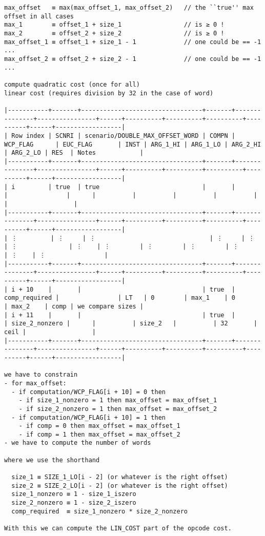 \documentclass[varwidth=\maxdimen,margin=0.5cm,multi={verbatim}]{standalone}
\begin{document}
\begin{verbatim}
max_offset   ≡ max(max_offset_1, max_offset_2)   // the ``true'' max offset in all cases
max_1        ≡ offset_1 + size_1                 // is ≥ 0 !
max_2        ≡ offset_2 + size_2                 // is ≥ 0 !
max_offset_1 ≡ offset_1 + size_1 - 1             // one could be == -1 ...
max_offset_2 ≡ offset_2 + size_2 - 1             // one could be == -1 ...

compute quadratic cost (once for all)
linear cost (requires division by 32 in the case of word)

|-----------+-------+---------------------------------+-------+---------------+----------------+------+----------+----------+----------+----------+------+------------------|
| Row index | SCNRI | scenario/DOUBLE_MAX_OFFSET_WORD | COMPN | WCP_FLAG      | EUC_FLAG       | INST | ARG_1_HI | ARG_1_LO | ARG_2_HI | ARG_2_LO | RES  | Notes            |
|-----------+-------+---------------------------------+-------+---------------+----------------+------+----------+----------+----------+----------+------+------------------|
| i         | true  | true                            |       |               |                |      |          |          |          |          |      |                  |
|-----------+-------+---------------------------------+-------+---------------+----------------+------+----------+----------+----------+----------+------+------------------|
| ⋮         | ⋮     | ⋮                               | ⋮     | ⋮             | ⋮              | ⋮    | ⋮        | ⋮        | ⋮        | ⋮        | ⋮    | ⋮                |
|-----------+-------+---------------------------------+-------+---------------+----------------+------+----------+----------+----------+----------+------+------------------|
| i + 10    |       |                                 | true  | comp_required |                | LT   | 0        | max_1    | 0        | max_2    | comp | we compare sizes |
| i + 11    |       |                                 | true  |               | size_2_nonzero |      |          | size_2   |          | 32       | ceil |                  |
|-----------+-------+---------------------------------+-------+---------------+----------------+------+----------+----------+----------+----------+------+------------------|

we have to constrain
- for max_offset:
  - if computation/WCP_FLAG[i + 10] = 0 then
    - if size_1_nonzero = 1 then max_offset = max_offset_1
    - if size_2_nonzero = 1 then max_offset = max_offset_2
  - if computation/WCP_FLAG[i + 10] = 1 then
    - if comp = 0 then max_offset = max_offset_1
    - if comp = 1 then max_offset = max_offset_2
- we have to compute the number of words

where we use the shorthand

  size_1 ≡ SIZE_1_LO[i - 2] (or whatever is the right offset)
  size_2 ≡ SIZE_2_LO[i - 2] (or whatever is the right offset)
  size_1_nonzero ≡ 1 - size_1_iszero
  size_2_nonzero ≡ 1 - size_2_iszero
  comp_required  ≡ size_1_nonzero * size_2_nonzero

With this we can compute the LIN_COST part of the opcode cost.



\end{verbatim}
\end{document}
